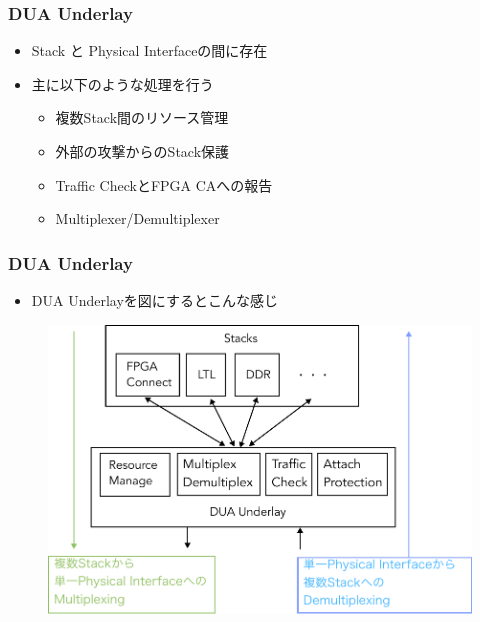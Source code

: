 \documentclass[dvipdfmx,9pt,notheorems]{beamer}
\theoremstyle{definition}
\begin{document}
\begin{frame}\frametitle{DUA Underlay}
	\begin{itemize}
		\item Stack と Physical Interfaceの間に存在
		\item 主に以下のような処理を行う
			\begin{itemize}
				\item 複数Stack間のリソース管理       %
				\item 外部の攻撃からのStack保護       %
				\item Traffic CheckとFPGA CAへの報告  %
				\item Multiplexer/Demultiplexer       %
			\end{itemize}
	\end{itemize}
\pnote{
}
\end{frame}

\begin{frame}\frametitle{DUA Underlay}
	\begin{itemize}
		\item DUA Underlayを図にするとこんな感じ
		\end{itemize}
  \begin{figure}[htb]
		\includegraphics[scale=0.5]{fig/ez_FPGA_Underlay.pdf}
  \end{figure}
\end{frame}
\end{document}
